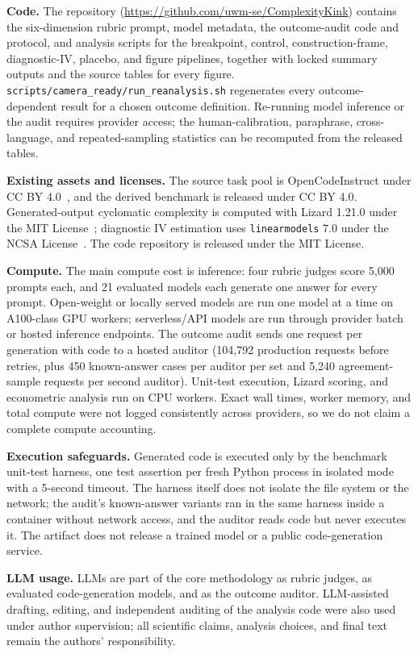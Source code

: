 \documentclass{article}
\newcommand{\codeurl}{\url{https://github.com/uwm-se/ComplexityKink}}
\begin{document}
\textbf{Code.} The repository (\codeurl{}) contains the six-dimension rubric prompt, model metadata, the outcome-audit code and protocol, and analysis scripts for the breakpoint, control, construction-frame, diagnostic-IV, placebo, and figure pipelines, together with locked summary outputs and the source tables for every figure. \texttt{scripts/camera\_ready/run\_reanalysis.sh} regenerates every outcome-dependent result for a chosen outcome definition. Re-running model inference or the audit requires provider access; the human-calibration, paraphrase, cross-language, and repeated-sampling statistics can be recomputed from the released tables.

\textbf{Existing assets and licenses.} The source task pool is OpenCodeInstruct under CC BY 4.0~\cite{opencodeinst}, and the derived benchmark is released under CC BY 4.0. %
Generated-output cyclomatic complexity is computed with Lizard 1.21.0 under the MIT License~\cite{lizard}; diagnostic IV estimation uses \texttt{linearmodels} 7.0 under the NCSA License~\cite{linearmodels}. The code repository is released under the MIT License.

\textbf{Compute.} The main compute cost is inference: four rubric judges score 5{,}000 prompts each, and 21 evaluated models each generate one answer for every prompt. Open-weight or locally served models are run one model at a time on A100-class GPU workers; serverless/API models are run through provider batch or hosted inference endpoints. The outcome audit sends one request per generation with code to a hosted auditor (104{,}792 production requests before retries, plus 450 known-answer cases per auditor per set and 5{,}240 agreement-sample requests per second auditor). Unit-test execution, Lizard scoring, and econometric analysis run on CPU workers. Exact wall times, worker memory, and total compute were not logged consistently across providers, so we do not claim a complete compute accounting.

\textbf{Execution safeguards.} Generated code is executed only by the benchmark unit-test harness, one test assertion per fresh Python process in isolated mode with a 5-second timeout. The harness itself does not isolate the file system or the network; the audit's known-answer variants ran in the same harness inside a container without network access, and the auditor reads code but never executes it. The artifact does not release a trained model or a public code-generation service.

\textbf{LLM usage.} LLMs are part of the core methodology as rubric judges, as evaluated code-generation models, and as the outcome auditor. LLM-assisted drafting, editing, and independent auditing of the analysis code were also used under author supervision; all scientific claims, analysis choices, and final text remain the authors' responsibility.

\newpage

\end{document}
